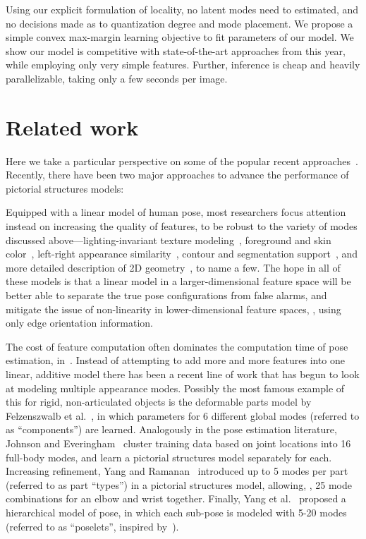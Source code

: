 Using our explicit formulation of locality, no latent modes need to estimated, 
and no decisions made as to quantization degree and mode placement.  We propose 
a simple convex max-margin learning objective to fit parameters of our model.  
We show our model is competitive with state-of-the-art approaches from this 
year, while employing only very simple features. Further, inference is cheap 
and heavily parallelizable, taking only a few seconds per image.


\section{Related work}
Here we take a particular perspective on some of the popular recent 
approaches~\citet{devacrf,eichner09,sapp2010cascades,sapp2011,andriluka09,ddtran}.  
Recently, there have been two major approaches to advance the performance of 
pictorial structures models:

  Equipped with a linear model of 
human pose, most researchers focus attention instead on increasing the quality 
of features, to be robust to the variety of modes discussed 
above---lighting-invariant texture modeling~\citep{andriluka09}, foreground and 
skin color~\citep{devacrf,eichner09}, left-right appearance 
similarity~\citep{ddtran,sapp2011}, contour and segmentation 
support~\citep{sapp2010cascades,sapp2011}, and more detailed description of 2D 
geometry~\citep{ddtran,sapp2011}, to name a few.  The hope in all of these 
models is that a linear model in a larger-dimensional feature space will be 
better able to separate the true pose configurations from false alarms, and 
mitigate the issue of non-linearity in lower-dimensional feature spaces, \eg, 
using only edge orientation information.

 The cost of feature computation often 
dominates the computation time of pose estimation, \eg 
in~\citep{devacrf,sapp2010}.  Instead of attempting to add more and more 
features into one linear, additive model there has been a recent line of work 
that has begun to look at modeling multiple appearance modes.  Possibly the 
most famous example of this for rigid, non-articulated objects is the 
deformable parts model by Felzenszwalb et al.~\citep{dpm}, in which parameters 
for 6 different global modes (referred to as ``components'') are learned.  
Analogously in the pose estimation literature, Johnson and 
Everingham~\citep{johnson11} cluster training data based on joint locations into 
16 full-body modes, and learn a pictorial structures model separately for each.  
Increasing refinement, Yang and Ramanan~\citep{deva2011} introduced up to 5 
modes per part (referred to as part ``types'') in a pictorial structures model, 
allowing, \eg, 25 mode combinations for an elbow and wrist together.  Finally, 
Yang et al.~\citep{wang2011} proposed a hierarchical model of pose, in which 
each sub-pose is modeled with 5-20 modes (referred to as ``poselets'', inspired 
by~\citep{bourdev09}).

